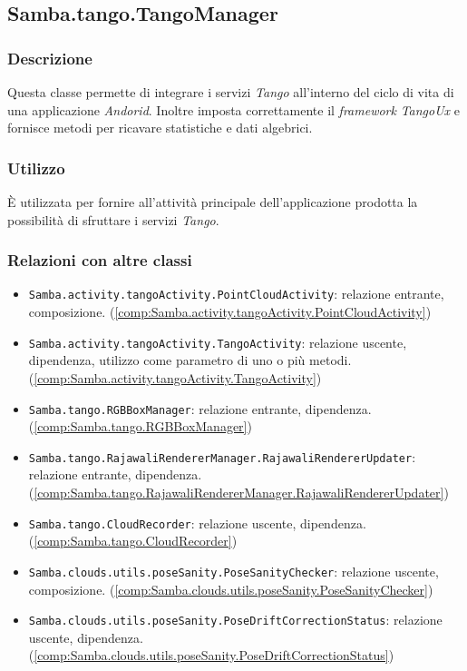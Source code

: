 \subsection{Samba.tango.TangoManager}\label{comp:Samba.tango.TangoManager}
\subsubsection{Descrizione}
Questa classe permette di integrare i servizi \emph{Tango} all'interno del ciclo di vita di una applicazione \emph{Andorid}. Inoltre imposta correttamente il \emph{framework} \emph{TangoUx} e fornisce metodi per ricavare statistiche e dati algebrici.
\subsubsection{Utilizzo}
È utilizzata per fornire all'attività principale dell'applicazione prodotta la possibilità di sfruttare i servizi \emph{Tango}.
\subsubsection{Relazioni con altre classi}
\begin{itemize}
	\item \texttt{Samba.activity.tangoActivity.PointCloudActivity}: relazione entrante, composizione. (\ref{comp:Samba.activity.tangoActivity.PointCloudActivity})
	\item \texttt{Samba.activity.tangoActivity.TangoActivity}: relazione uscente, dipendenza, utilizzo come parametro di uno o più metodi. (\ref{comp:Samba.activity.tangoActivity.TangoActivity})
	\item \texttt{Samba.tango.RGBBoxManager}: relazione entrante, dipendenza. (\ref{comp:Samba.tango.RGBBoxManager})
	\item \texttt{Samba.tango.RajawaliRendererManager.RajawaliRendererUpdater}: relazione entrante, dipendenza. (\ref{comp:Samba.tango.RajawaliRendererManager.RajawaliRendererUpdater})
	\item \texttt{Samba.tango.CloudRecorder}: relazione uscente, dipendenza. (\ref{comp:Samba.tango.CloudRecorder})
	\item \texttt{Samba.clouds.utils.poseSanity.PoseSanityChecker}: relazione uscente, composizione. (\ref{comp:Samba.clouds.utils.poseSanity.PoseSanityChecker})
	\item \texttt{Samba.clouds.utils.poseSanity.PoseDriftCorrectionStatus}: relazione uscente, dipendenza. (\ref{comp:Samba.clouds.utils.poseSanity.PoseDriftCorrectionStatus})
\end{itemize}

